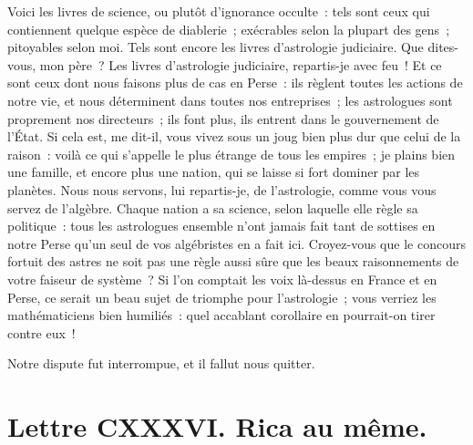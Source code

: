 \documentclass[french,twoside]{book} %
\newcommand{\dateline}[1]{\medskip{\RaggedLeft{#1}\par}\bigskip}
\begin{document}
Voici les livres de science, ou plutôt d’ignorance occulte : tels sont ceux qui contiennent quelque espèce de diablerie ; exécrables selon la plupart des gens ; pitoyables selon moi. Tels sont encore les livres d’astrologie judiciaire. Que dites-vous, mon père ? Les livres d’astrologie judiciaire, repartis-je avec feu ! Et ce sont ceux dont nous faisons plus de cas en Perse : ils règlent toutes les actions de notre vie, et nous déterminent dans toutes nos entreprises ; les astrologues sont proprement nos directeurs ; ils font plus, ils entrent dans le gouvernement de l’État. Si cela est, me dit-il, vous vivez sous un joug bien plus dur que celui de la raison : voilà ce qui s’appelle le plus étrange de tous les empires ; je plains bien une famille, et encore plus une nation, qui se laisse si fort dominer par les planètes. Nous nous servons, lui repartis-je, de l’astrologie, comme vous vous servez de l’algèbre. Chaque nation a sa science, selon laquelle elle règle sa politique : tous les astrologues ensemble n’ont jamais fait tant de sottises en notre Perse qu’un seul de vos algébristes en a fait ici. Croyez-vous que le concours fortuit des astres ne soit pas une règle aussi sûre que les beaux raisonnements de votre faiseur de système ? Si l’on comptait les voix là-dessus en France et en Perse, ce serait un beau sujet de triomphe pour l’astrologie ; vous verriez les mathématiciens bien humiliés : quel accablant corollaire en pourrait-on tirer contre eux !\par
Notre dispute fut interrompue, et il fallut nous quitter.\par

\dateline{De Paris, le 6 de la lune de Rhamazan, 1719.}
\section[{Lettre CXXXVI. Rica au même.}]{Lettre CXXXVI. Rica au même.}\renewcommand{\leftmark}{Lettre CXXXVI. Rica au même.}
\end{document}

